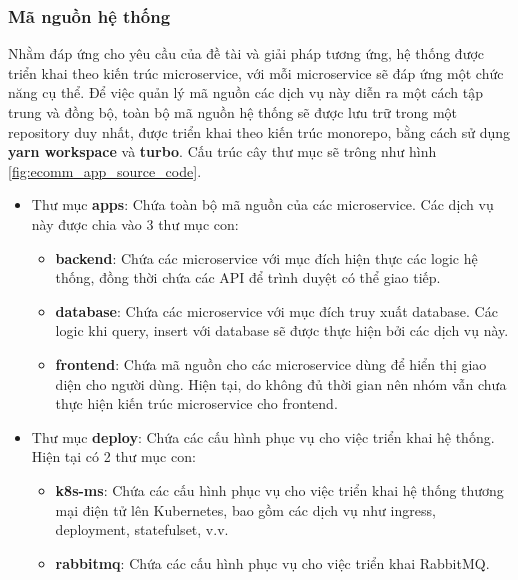\subsubsection{Mã nguồn hệ thống}
\noindent Nhằm đáp ứng cho yêu cầu của đề tài và giải pháp tương ứng, hệ thống được triển khai theo kiến trúc microservice, với mỗi microservice sẽ đáp ứng một chức năng cụ thể. Để việc quản lý mã nguồn các dịch vụ này diễn ra một cách tập trung và đồng bộ, toàn bộ mã nguồn hệ thống sẽ được lưu trữ trong một repository duy nhất, được triển khai theo kiến trúc monorepo, bằng cách sử dụng \textbf{yarn workspace} và \textbf{turbo}. Cấu trúc cây thư mục sẽ trông như hình \ref{fig:ecomm_app_source_code}.
\begin{itemize}
    \item Thư mục \textbf{apps}: Chứa toàn bộ mã nguồn của các microservice. Các dịch vụ này được chia vào 3 thư mục con:
    \begin{itemize}
        \item \textbf{backend}: Chứa các microservice với mục đích hiện thực các logic hệ thống, đồng thời chứa các API để trình duyệt có thể giao tiếp.
        \item \textbf{database}: Chứa các microservice với mục đích truy xuất database. Các logic khi query, insert với database sẽ được thực hiện bởi các dịch vụ này.
        \item \textbf{frontend}: Chứa mã nguồn cho các microservice dùng để hiển thị giao diện cho người dùng. Hiện tại, do không đủ thời gian nên nhóm vẫn chưa thực hiện kiến trúc microservice cho frontend.
    \end{itemize}
    \item Thư mục \textbf{deploy}: Chứa các cấu hình phục vụ cho việc triển khai hệ thống. Hiện tại có 2 thư mục con:
    \begin{itemize}
        \item \textbf{k8s-ms}: Chứa các cấu hình phục vụ cho việc triển khai hệ thống thương mại điện tử lên Kubernetes, bao gồm các dịch vụ như ingress, deployment, statefulset, v.v.
        \item \textbf{rabbitmq}: Chứa các cấu hình phục vụ cho việc triển khai RabbitMQ.
    \end{itemize}
\end{itemize}
